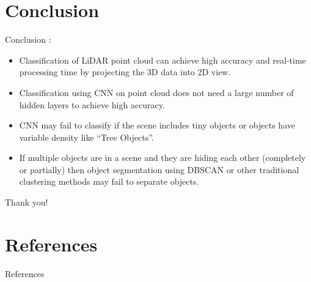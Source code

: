 \documentclass[9pt]{beamer}
\begin{document}

\section{Conclusion}
\begin{frame}[fragile]{Conclusion }
:
\begin{itemize}
	\item Classification of LiDAR point cloud can achieve high accuracy and real-time processing time by projecting the 3D data into 2D view.
	\item Classification using CNN on point cloud does not need a large number of hidden layers to achieve high accuracy.
	\item CNN may fail to classify if the scene includes tiny objects or objects have variable density like ``Tree Objects''.
	\item If multiple objects are in a scene and they are hiding each other (completely or partially) then object segmentation using DBSCAN
	or other traditional clustering methods may fail to separate objects.
\end{itemize}
\end{frame}

\appendix
\begin{frame}[fragile]{}

\centering
\Huge
Thank you!

\end{frame}

\section{References}
\begin{frame}[allowframebreaks]{References}

	
	

\end{frame}
\end{document}
